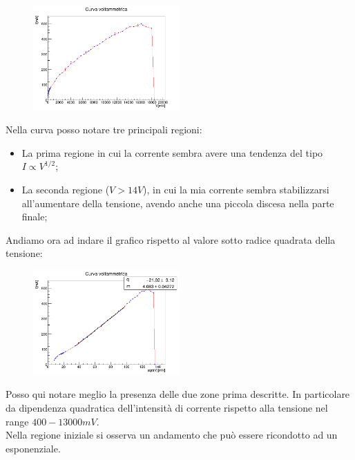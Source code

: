 \documentclass[10pt,twocolumn]{article}
\begin{document}
\begin{figure}[H] %
  \centering
  \includegraphics[width=0.5\textwidth]{curva_voltammetrica/curva_voltamperometrica.png} %
  \label{fig:I_V_}
\end{figure}
Nella curva posso notare tre principali regioni:
\begin{itemize}
    \item La prima regione in cui la corrente sembra avere una tendenza del tipo $I \propto V^{1/2}$;
    \item La seconda regione ($V > 14V$), in cui la mia corrente sembra stabilizzarsi all'aumentare della tensione, avendo anche una piccola discesa nella parte finale;
\end{itemize}
Andiamo ora ad indare il grafico rispetto al valore sotto radice quadrata della tensione:
\begin{figure}[H] %
  \centering
  \includegraphics[width=0.5\textwidth]{curva_voltammetrica/curva_voltammetrica_sqrt.png} %
  \label{fig:I_V_}
\end{figure}
Posso qui notare meglio la presenza delle due zone prima descritte. In particolare da dipendenza quadratica dell'intensità di corrente rispetto alla tensione nel range $400-13000mV$.\\ 
Nella regione iniziale si osserva un andamento che può essere ricondotto ad un esponenziale. 
\end{document}
